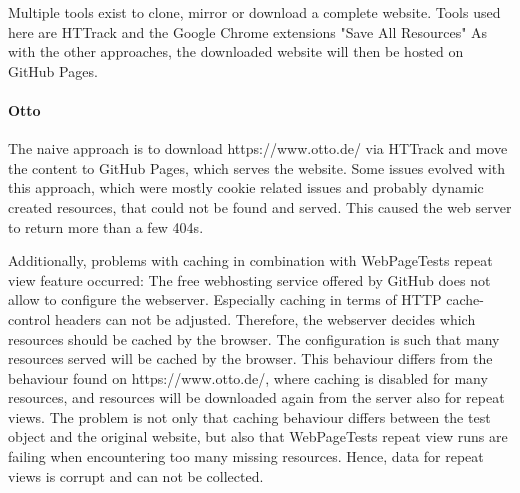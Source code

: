 
Multiple tools exist to clone, mirror or download a complete website.
Tools used here are HTTrack and the Google Chrome extensions "Save All Resources"
As with the other approaches, the downloaded website will then be hosted on GitHub Pages.



\paragraph{Otto}


The naive approach is to download https://www.otto.de/ via HTTrack and move the content to GitHub Pages, which serves the website.
Some issues evolved with this approach, which were mostly cookie related issues and probably dynamic created resources, that could not be found and served.
This caused the web server to return more than a few 404s.

Additionally, problems with caching in combination with WebPageTests repeat view feature occurred:
The free webhosting service offered by GitHub does not allow to configure the webserver.
Especially caching in terms of HTTP cache-control headers can not be adjusted.
Therefore, the webserver decides which resources should be cached by the browser.
The configuration is such that many resources served will be cached by the browser.
This behaviour differs from the behaviour found on https://www.otto.de/, where caching is disabled for many resources, and resources will be downloaded again from the server also for repeat views.
The problem is not only that caching behaviour differs between the test object and the original website, but also that WebPageTests repeat view runs are failing when encountering too many missing resources.
Hence, data for repeat views is corrupt and can not be collected.




